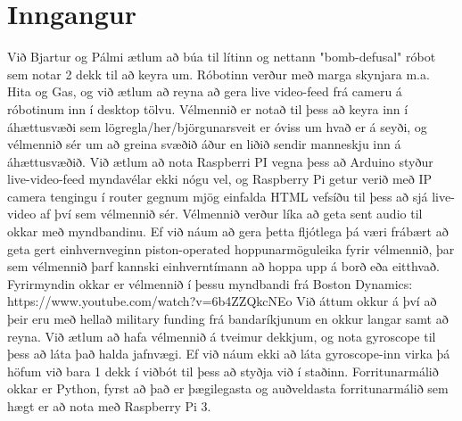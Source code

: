 \section{Inngangur}
Við Bjartur og Pálmi ætlum að búa til lítinn og nettann "bomb-defusal" róbot sem notar 2 dekk til að keyra um. Róbotinn verður með marga skynjara m.a. Hita og Gas, og við ætlum að reyna að gera live video-feed frá cameru á róbotinum inn í desktop tölvu. Vélmennið er notað til þess að keyra inn í áhættusvæði sem lögregla/her/björgunarsveit er óviss um hvað er á seyði, og vélmennið sér um að greina svæðið áður en liðið sendir manneskju inn á áhættusvæðið. Við ætlum að nota Raspberri PI vegna þess að Arduino styður live-video-feed myndavélar ekki nógu vel, og Raspberry Pi getur verið með IP camera tengingu í router gegnum mjög einfalda HTML vefsíðu til þess að sjá live-video af því sem vélmennið sér. Vélmennið verður líka að geta sent audio til okkar með myndbandinu. Ef við náum að gera þetta fljótlega þá væri frábært að geta gert einhvernveginn piston-operated hoppunarmöguleika fyrir vélmennið, þar sem vélmennið þarf kannski einhverntímann að hoppa upp á borð eða eitthvað. Fyrirmyndin okkar er vélmennið í þessu myndbandi frá Boston Dynamics: https://www.youtube.com/watch?v=6b4ZZQkcNEo Við áttum okkur á því að þeir eru með hellað military funding frá bandaríkjunum en okkur langar samt að reyna. Við ætlum að hafa vélmennið á tveimur dekkjum, og nota gyroscope til þess að láta það halda jafnvægi. Ef við náum ekki að láta gyroscope-inn virka þá höfum við bara 1 dekk í viðbót til þess að styðja við í staðinn. Forritunarmálið okkar er Python, fyrst að það er þægilegasta og auðveldasta forritunarmálið sem hægt er að nota með Raspberry Pi 3.